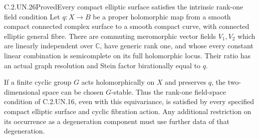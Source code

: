\begin{statement}{C.2.UN.26}{Proved}{Every compact elliptic surface satisfies the intrinsic rank-one field condition}
Let $q:X\to B$ be a proper holomorphic map from a
smooth compact connected complex surface to a smooth
compact curve, with connected elliptic general fibre.
There are commuting meromorphic vector fields $V_1,V_2$
which are linearly independent over $\mathbb C$, have
generic rank one, and whose every constant linear
combination is semicomplete on its full holomorphic
locus. Their ratio has an actual graph resolution and
Stein factor birationally equal to $q$.

If a finite cyclic group $G$ acts holomorphically on
$X$ and preserves $q$, the two-dimensional space can
be chosen $G$-stable. Thus the rank-one field-space
condition of C.2.UN.16, even with this equivariance,
is satisfied by every specified compact elliptic
surface and cyclic fibration action. Any additional
restriction on its occurrence as a degeneration
component must use further data of that degeneration.
\end{statement}

